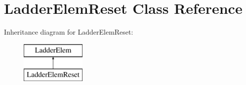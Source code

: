 \hypertarget{class_ladder_elem_reset}{\section{Ladder\-Elem\-Reset Class Reference}
\label{class_ladder_elem_reset}
}
Inheritance diagram for Ladder\-Elem\-Reset\-:\begin{figure}[H]
\begin{center}
\leavevmode
\includegraphics[height=2.000000cm]{class_ladder_elem_reset}
\end{center}
\end{figure}
